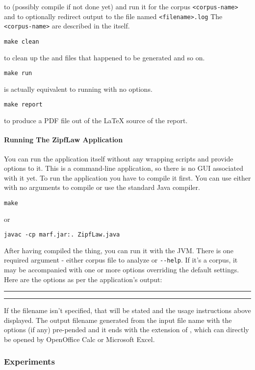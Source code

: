 	to (possibly compile if not done yet) and run it for the corpus
	\verb+<corpus-name>+ and to optionally redirect output to the file
	named \verb+<filename>.log+
	The \verb+<corpus-name>+ are described in the  itself.

\noindent
\verb+make clean+

	to clean up the  and  files that happened to be
	generated and so on.

\noindent
\verb+make run+

	is actually equivalent to running  with no options.

\noindent
\verb+make report+

	to produce a PDF file out of the {\LaTeX} source of the report.

\paragraph{Running The ZipfLaw Application}
\label{sect:zipf-law-app}

You can run the application itself without any wrapping scripts
and provide options to it. This is a command-line application,
so there is no GUI associated with it yet. To run the application
you have to compile it first. You can use either  with no
arguments to compile or use the standard Java compiler.

\noindent
\verb+make+

or

\noindent
\verb+javac -cp marf.jar:. ZipfLaw.java+

\noindent
After having compiled the thing, you can run it with the JVM.
There is one required argument - either corpus file to analyze
or \verb+--help+. If it's a corpus, it
may be accompanied with one or more options overriding the default
settings. Here are the options as per the application's output:

\vspace{15pt}
\hrule

\hrule
\vspace{15pt}

If the filename isn't specified, that will be stated and the usage
instructions above displayed.
The output filename generated from the input file name with the
options (if any) pre-pended and it ends with the extension of ,
which can directly be opened by OpenOffice Calc or Microsoft Excel.

\subsubsection{Experiments}

